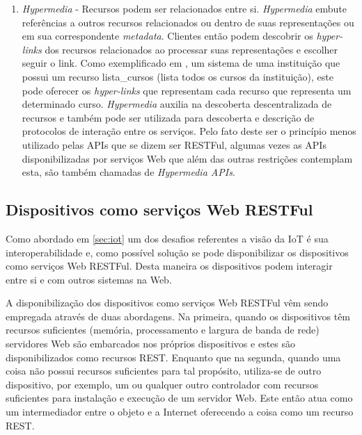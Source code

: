 \begin{enumerate}
\item \textit{Hypermedia} - Recursos podem ser relacionados entre si. \textit{Hypermedia} embute referências a outros recursos relacionados ou dentro de suas representações ou em sua correspondente \textit{metadata}. Clientes então podem descobrir os \textit{hyper-links} dos recursos relacionados ao processar suas representações e escolher seguir o link. Como exemplificado em \cite{Franca:2011}, um sistema de uma instituição que possui um recurso lista\_cursos (lista todos os cursos da instituição), este pode oferecer os \textit{hyper-links} que representam cada recurso que representa um determinado curso. \textit{Hypermedia} auxilia na descoberta descentralizada de recursos e também pode ser utilizada para descoberta e descrição de protocolos de interação entre os serviços. Pelo fato deste ser o princípio menos utilizado pelas APIs que se dizem ser RESTFul, algumas vezes as APIs disponibilizadas por serviços Web que além das outras restrições contemplam esta, são também chamadas de \textit{Hypermedia APIs}.\cite{Pautasso:2014}
\end{enumerate}

\subsection{Dispositivos como serviços Web RESTFul} 
\label{subsec:dispositivosWeb}
Como abordado em \ref{sec:iot} um dos desafios referentes a visão da IoT é sua interoperabilidade e, como possível solução se pode disponibilizar os dispositivos como serviços Web RESTFul. Desta maneira os dispositivos podem interagir entre si e com outros sistemas na Web.

A disponibilização dos dispositivos como serviços Web RESTFul vêm sendo empregada através de duas abordagens. Na primeira, quando os dispositivos têm recursos suficientes (memória, processamento e largura de banda de rede) servidores Web são embarcados nos próprios dispositivos e estes são disponibilizados como recursos REST. Enquanto que na segunda, quando uma coisa não possui recursos suficientes para tal propósito, utiliza-se de outro dispositivo, por exemplo, um  ou qualquer outro controlador com recursos suficientes para instalação e execução de um servidor Web. Este então atua como um intermediador entre o objeto e a Internet oferecendo a coisa como um recurso REST.\cite{Franca:2011}

